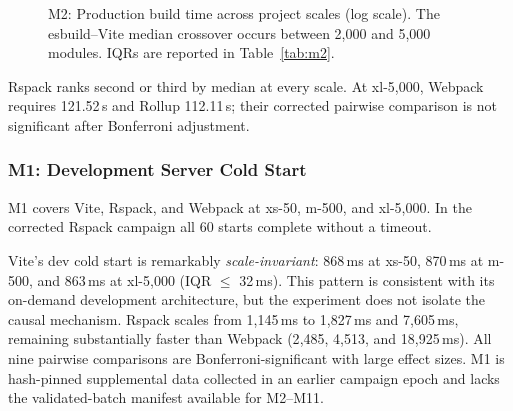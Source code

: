 \documentclass[preprint,12pt]{elsarticle}
\begin{document}
\begin{figure}[htbp]
\centering
{}
\caption{M2: Production build time across project scales (log scale). The esbuild--Vite median crossover occurs between 2{,}000 and 5{,}000 modules. IQRs are reported in Table~\ref{tab:m2}.}\label{fig:m2}
\end{figure}

Rspack ranks second or third by median at every scale.
At xl-5{,}000, Webpack requires 121.52\,s and Rollup 112.11\,s; their corrected pairwise comparison is not significant after Bonferroni adjustment.

\subsubsection{M1: Development Server Cold Start}

M1 covers Vite, Rspack, and Webpack at xs-50, m-500, and xl-5{,}000.
In the corrected Rspack campaign all 60 starts complete without a timeout.

Vite's dev cold start is remarkably \emph{scale-invariant}: 868\,ms at xs-50, 870\,ms at m-500, and 863\,ms at xl-5{,}000 (IQR $\leq$ 32\,ms).
This pattern is consistent with its on-demand development architecture, but the experiment does not isolate the causal mechanism.
Rspack scales from 1{,}145\,ms to 1{,}827\,ms and 7{,}605\,ms, remaining substantially faster than Webpack (2{,}485, 4{,}513, and 18{,}925\,ms).
All nine pairwise comparisons are Bonferroni-significant with large effect sizes.
M1 is hash-pinned supplemental data collected in an earlier campaign epoch and lacks the validated-batch manifest available for M2--M11.
\end{document}
